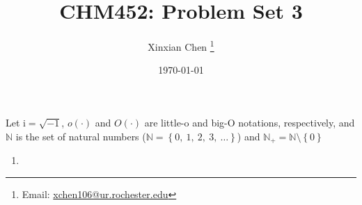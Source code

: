 \documentclass{article}
\title{CHM452: Problem Set 3}
\author{Xinxian Chen%
\footnote{Email: \href{mailto:xchen106@ur.rochester.edu}{xchen106@ur.rochester.edu}}}
\date{\today}
\newcommand{\iu}{\ensuremath{\mathrm{i}}}
\newcommand{\set}[1]{\ensuremath{\left\{{#1}\right\}}}
\begin{document}
\maketitle

Let $\iu = \sqrt{-1}$, $o(\cdot)$ and $O(\cdot)$ are little-o and big-O notations, respectively, and $\mathbb{N}$ is the set of natural numbers ($\mathbb{N} = \set{0,\ 1,\ 2,\ 3,\ \ldots}$) and $\mathbb{N}_+ = \mathbb{N}\setminus\set{0}$

\begin{enumerate}[1.]
  \item 
 
\end{enumerate}
\end{document}
